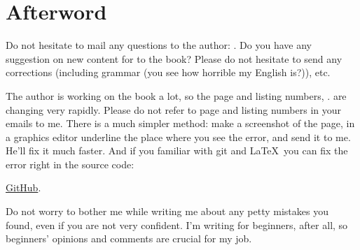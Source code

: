 \part*{Afterword}


Do not hesitate to mail any questions to the author: \GTT{<\EMAIL>}.
Do you have any suggestion on new content for to the book?
Please do not hesitate to send any corrections (including grammar (you see how horrible my English is?)), etc.

The author is working on the book a lot, so the page and listing numbers, \etc. are changing very rapidly.
Please do not refer to page and listing numbers in your emails to me.
There is a much simpler method: make a screenshot of the page, in a graphics editor underline the place where you see the error,
and send it to me. He'll fix it much faster.
And if you familiar with git and \LaTeX\, you can fix the error right in the source code:

\href{http://go.yurichev.com/17089}{GitHub}.

Do not worry to bother me while writing me about any petty mistakes you found, even if you are not very confident.
I'm writing for beginners, after all, so beginners' opinions and comments are crucial for my job.

